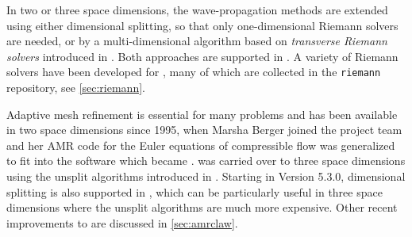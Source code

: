 In two or three space dimensions, the wave-propagation methods
are extended using either dimensional splitting, so that only
one-dimensional Riemann solvers are needed, or by a multi-dimensional
algorithm based on {\em transverse Riemann solvers} introduced in
\cite{rjl:wpalg}.  Both approaches are supported in \clawpack.
A variety of Riemann solvers have been developed for \clawpack, many
of which are collected in the \texttt{riemann} repository, see
\cref{sec:riemann}.

Adaptive mesh refinement is essential for many problems and has been
available in two space dimensions since 1995, when Marsha Berger
joined the project team and her AMR code for the Euler equations of
compressible flow was generalized to fit into the software which
became \amrclaw \cite{Berger:1998ia}.  \amrclaw was carried over to
three space dimensions using the unsplit algorithms introduced in
\cite{jol-rjl:3d}.  Starting in Version 5.3.0, dimensional splitting
is also supported in \amrclaw, which can be particularly useful in
three space dimensions where the unsplit algorithms are much more
expensive.  Other recent improvements to \amrclaw are discussed in
\cref{sec:amrclaw}.

